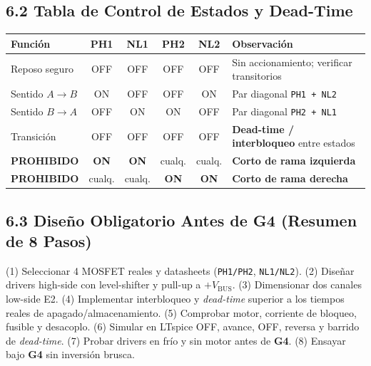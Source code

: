 \documentclass[10pt, a4paper, landscape]{article}
\begin{document}
\begin{minipage}[t]{0.50\linewidth}
\subsection*{6.2 Tabla de Control de Estados y Dead-Time}
\par\vspace{0.05cm}\noindent
\renewcommand{\arraystretch}{1.15}
{\footnotesize
\begin{tabularx}{\linewidth}{|l|c|c|c|c|>{\raggedright\arraybackslash}X|}
\hline
\rowcolor{ucbgray}
\textbf{Función} & \textbf{PH1} & \textbf{NL1} & \textbf{PH2} & \textbf{NL2} & \textbf{Observación} \\ \hline
Reposo seguro & OFF & OFF & OFF & OFF & Sin accionamiento; verificar transitorios \\ \hline
Sentido $A \rightarrow B$ & ON & OFF & OFF & ON & Par diagonal \texttt{PH1 + NL2} \\ \hline
Sentido $B \rightarrow A$ & OFF & ON & ON & OFF & Par diagonal \texttt{PH2 + NL1} \\ \hline
Transición & OFF & OFF & OFF & OFF & \textbf{Dead-time / interbloqueo} entre estados \\ \hline
\textcolor{warnred}{\textbf{PROHIBIDO}} & \textcolor{warnred}{\textbf{ON}} & \textcolor{warnred}{\textbf{ON}} & cualq. & cualq. & \textbf{Corto de rama izquierda} \\ \hline
\textcolor{warnred}{\textbf{PROHIBIDO}} & cualq. & cualq. & \textcolor{warnred}{\textbf{ON}} & \textcolor{warnred}{\textbf{ON}} & \textbf{Corto de rama derecha} \\ \hline
\end{tabularx}
}

\subsection*{6.3 Diseño Obligatorio Antes de G4 (Resumen de 8 Pasos)}
{\footnotesize
(1) Seleccionar 4 MOSFET reales y datasheets (\texttt{PH1/PH2}, \texttt{NL1/NL2}). (2) Diseñar drivers high-side con level-shifter y pull-up a $+V_{\text{BUS}}$. (3) Dimensionar dos canales low-side E2. (4) Implementar interbloqueo y \textit{dead-time} superior a los tiempos reales de apagado/almacenamiento. (5) Comprobar motor, corriente de bloqueo, fusible y desacoplo. (6) Simular en LTspice OFF, avance, OFF, reversa y barrido de \textit{dead-time}. (7) Probar drivers en frío y sin motor antes de \textbf{G4}. (8) Ensayar bajo \textbf{G4} sin inversión brusca.
}
\end{minipage}
\end{document}
